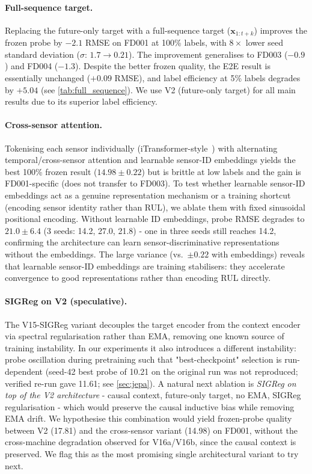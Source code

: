 \documentclass{article}
\newcommand{\plannedc}[1]{{\color{blue}#1}}
\newcommand{\plannedc}[1]{#1}
\newcommand{\x}{\mathbf{x}}
\begin{document}
\paragraph{Full-sequence target.} Replacing the future-only target with a full-sequence target ($\x_{1:t+k}$) improves the frozen probe by $-2.1$ RMSE on FD001 at 100\% labels, with $8\times$ lower seed standard deviation ($\sigma$: $1.7 \to 0.21$). The improvement generalises to FD003 ($-0.9$) and FD004 ($-1.3$). Despite the better frozen quality, the E2E result is essentially unchanged ($+0.09$ RMSE), and label efficiency at 5\% labels degrades by $+5.04$ (see \cref{tab:full_sequence}). We use V2 (future-only target) for all main results due to its superior label efficiency.

\paragraph{Cross-sensor attention.}
\label{sec:cross_sensor}
Tokenising each sensor individually (iTransformer-style~\citep{liu2024itransformer}) with alternating temporal/cross-sensor attention and learnable sensor-ID embeddings yields the best 100\% frozen result ($14.98 \pm 0.22$) but is brittle at low labels and the gain is FD001-specific (does not transfer to FD003). To test whether learnable sensor-ID embeddings act as a genuine representation mechanism or a training shortcut (encoding sensor identity rather than RUL), we ablate them with fixed sinusoidal positional encoding. Without learnable ID embeddings, probe RMSE degrades to $21.0 \pm 6.4$ (3 seeds: 14.2, 27.0, 21.8) - one in three seeds still reaches 14.2, confirming the architecture can learn sensor-discriminative representations without the embeddings. The large variance (vs.\ $\pm 0.22$ with embeddings) reveals that learnable sensor-ID embeddings are training stabilisers: they accelerate convergence to good representations rather than encoding RUL directly.

\paragraph{SIGReg on V2 (speculative).}
\plannedc{The V15-SIGReg variant decouples the target encoder from the context encoder via spectral regularisation rather than EMA, removing one known source of training instability. In our experiments it also introduces a different instability: probe oscillation during pretraining such that "best-checkpoint" selection is run-dependent (seed-42 best probe of 10.21 on the original run was not reproduced; verified re-run gave 11.61; see \cref{sec:jepa}). A natural next ablation is \emph{SIGReg on top of the V2 architecture} - causal context, future-only target, no EMA, SIGReg regularisation - which would preserve the causal inductive bias while removing EMA drift. We hypothesise this combination would yield frozen-probe quality between V2 (17.81) and the cross-sensor variant (14.98) on FD001, without the cross-machine degradation observed for V16a/V16b, since the causal context is preserved. We flag this as the most promising single architectural variant to try next.}
\end{document}
